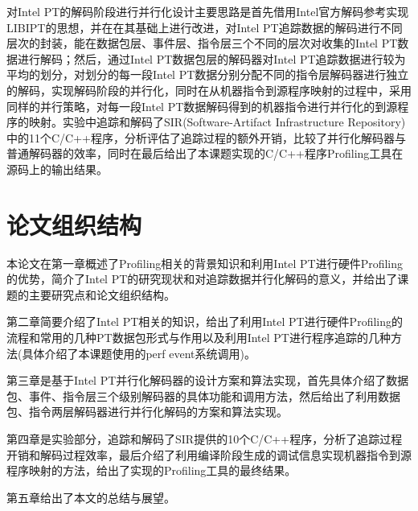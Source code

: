 对Intel PT的解码阶段进行并行化设计主要思路是首先借用Intel官方解码参考实现LIBIPT的思想，并在在其基础上进行改进，对Intel PT追踪数据的解码进行不同层次的封装，能在数据包层、事件层、指令层三个不同的层次对收集的Intel PT数据进行解码；然后，通过Intel PT数据包层的解码器对Intel PT追踪数据进行较为平均的划分，对划分的每一段Intel PT数据分别分配不同的指令层解码器进行独立的解码，实现解码阶段的并行化，同时在从机器指令到源程序映射的过程中，采用同样的并行策略，对每一段Intel PT数据解码得到的机器指令进行并行化的到源程序的映射。实验中追踪和解码了SIR(Software-Artifact Infrastructure Repository)中的11个C/C++程序，分析评估了追踪过程的额外开销，比较了并行化解码器与普通解码器的效率，同时在最后给出了本课题实现的C/C++程序Profiling工具在源码上的输出结果。

\section{论文组织结构}
本论文在第一章概述了Profiling相关的背景知识和利用Intel PT进行硬件Profiling的优势，简介了Intel PT的研究现状和对追踪数据并行化解码的意义，并给出了课题的主要研究点和论文组织结构。

第二章简要介绍了Intel PT相关的知识，给出了利用Intel PT进行硬件Profiling的流程和常用的几种PT数据包形式与作用以及利用Intel PT进行程序追踪的几种方法(具体介绍了本课题使用的perf event系统调用)。

第三章是基于Intel PT并行化解码器的设计方案和算法实现，首先具体介绍了数据包、事件、指令层三个级别解码器的具体功能和调用方法，然后给出了利用数据包、指令两层解码器进行并行化解码的方案和算法实现。 

第四章是实验部分，追踪和解码了SIR提供的10个C/C++程序，分析了追踪过程开销和解码过程效率，最后介绍了利用编译阶段生成的调试信息实现机器指令到源程序映射的方法，给出了实现的Profiling工具的最终结果。

第五章给出了本文的总结与展望。